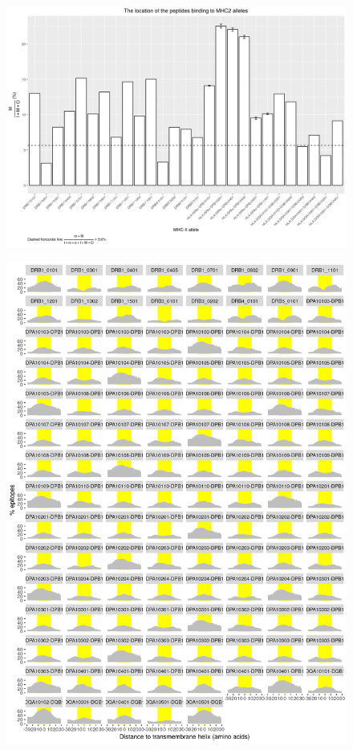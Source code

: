\documentclass{article}
\begin{document}
\begin{figure}[ht]
  \includegraphics[width=\textwidth]{figure_1_5.png}
  \label{fig:1_5}
\end{figure}

\begin{figure}[ht]
  \includegraphics[width=\textwidth]{figure_3.png}
  \label{fig:3}
\end{figure}
\end{document}
